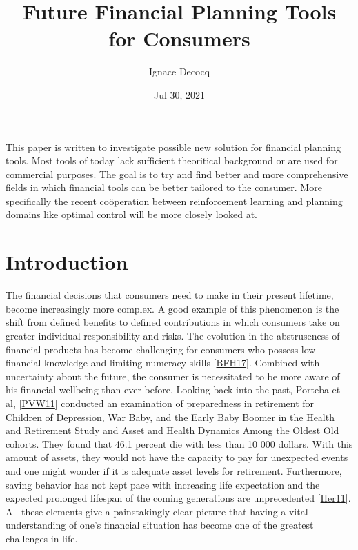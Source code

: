 \documentclass[letterpaper,10pt,english]{jupyterBook}
\title{Future Financial Planning Tools for Consumers}
\date{Jul 30, 2021}
\author{Ignace Decocq}
\begin{document}
\pagestyle{empty}
\sphinxmaketitle
\pagestyle{plain}
\sphinxtableofcontents
\pagestyle{normal}
\label{\detokenize{abstract::doc}}


\sphinxAtStartPar
This paper is  written to investigate possible new solution for financial planning tools. Most tools of today lack sufficient theoritical background or are used for commercial purposes. The goal is to try and find better and more comprehensive fields in which financial tools can be better tailored to the consumer. More specifically the recent coöperation between reinforcement learning and planning domains like optimal control will be more closely looked at.


\section{Introduction}
\label{\detokenize{Introduction:introduction}}\label{\detokenize{Introduction::doc}}
\sphinxAtStartPar
The financial decisions that consumers need to make in their present lifetime, become increasingly more complex. A good example of this phenomenon is the shift from defined benefits to defined contributions in which consumers take on greater individual responsibility and risks. The evolution in the abstruseness of financial products has become challenging for consumers who possess low financial knowledge and limiting numeracy skills {[}\hyperlink{cite.Financial_application:id26}{BFH17}{]}. Combined with uncertainty about the future, the consumer is necessitated to be more aware of his financial well\sphinxhyphen{}being than ever before. Looking back into the past, Porteba et al, {[}\hyperlink{cite.Financial_application:id28}{PVW11}{]} conducted an examination of preparedness in retirement for Children of Depression, War Baby, and the Early Baby Boomer in the Health and Retirement Study and Asset and Health Dynamics Among the Oldest Old cohorts. They found that 46.1 percent die with less than 10 000 dollars. With this amount of assets, they would not have the capacity to pay for unexpected events and one might wonder if it is adequate asset levels for retirement. Furthermore, saving behavior has not kept pace with increasing life expectation and the expected prolonged lifespan of the coming generations are unprecedented {[}\hyperlink{cite.Financial_application:id29}{Her11}{]}. All these elements give a painstakingly clear picture that having a vital understanding of one’s financial situation has become one of the greatest challenges in life.
\end{document}
